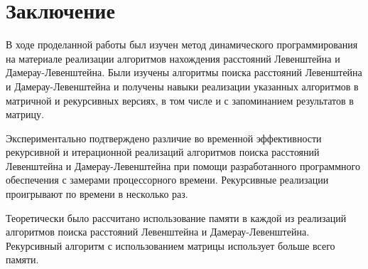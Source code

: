 \documentclass[12pt]{report}
\begin{document}
    \chapter*{Заключение}
    В ходе проделанной работы был изучен метод динамического программирования на материале реализации
    алгоритмов нахождения расстояний Левенштейна и Дамерау-Левенштейна.
    Были изучены алгоритмы поиска расстояний Левенштейна и Дамерау-Левенштейна и получены навыки
    реализации указанных алгоритмов в матричной и рекурсивных версиях,
    в том числе и с запоминанием результатов в матрицу.

    Экспериментально подтверждено различие во временной эффективности рекурсивной и итерационной
    реализаций алгоритмов поиска расстояний Левенштейна и Дамерау-Левенштейна
    при помощи разработанного программного обеспечения с замерами процессорного времени.
    Рекурсивные реализации проигрывают по времени в несколько раз.

    Теоретически было рассчитано использование памяти в каждой из реализаций алгоритмов поиска
    расстояний Левенштейна и Дамерау-Левенштейна. Рекурсивный алгоритм с использованием матрицы
    использует больше всего памяти.

    \newpage

\end{document}
